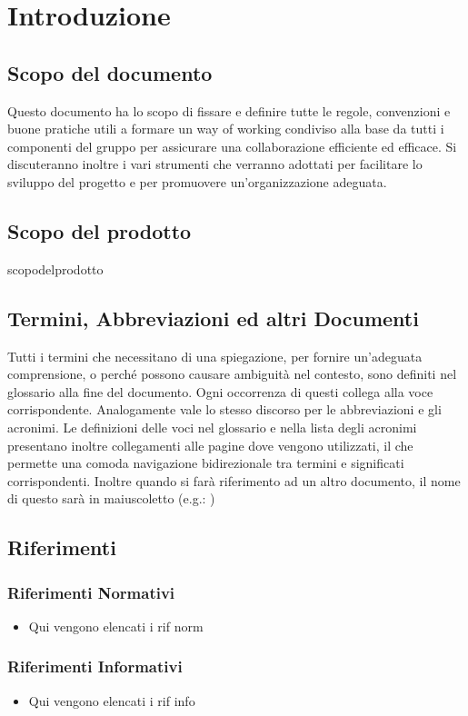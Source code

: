 \section{Introduzione}
\subsection{Scopo del documento}
    Questo documento ha lo scopo di fissare e definire tutte le regole, convenzioni e buone pratiche utili a formare un way of working condiviso alla base da tutti i componenti del gruppo per assicurare una collaborazione efficiente ed efficace. Si discuteranno inoltre i vari strumenti che verranno adottati per facilitare lo sviluppo del progetto e per promuovere un'organizzazione adeguata.

\subsection{Scopo del prodotto}
    scopodelprodotto

\subsection{Termini, Abbreviazioni ed altri Documenti}
    Tutti i termini che necessitano di una spiegazione, per fornire un'adeguata comprensione, o perché possono causare ambiguità nel contesto, sono definiti nel glossario alla fine del documento. Ogni occorrenza di questi collega alla voce corrispondente. Analogamente vale lo stesso discorso per le abbreviazioni e gli acronimi. Le definizioni delle voci nel glossario e nella lista degli acronimi presentano inoltre collegamenti alle pagine dove vengono utilizzati, il che permette una comoda navigazione bidirezionale tra termini e significati corrispondenti.
    Inoltre quando si farà riferimento ad un altro documento, il nome di questo sarà in maiuscoletto (e.g.: \textsc{})

\subsection{Riferimenti}
    \subsubsection{Riferimenti Normativi}
        \begin{itemize}
            \item Qui vengono elencati i rif norm
        \end{itemize}
    \subsubsection{Riferimenti Informativi}
        \begin{itemize}
            \item Qui vengono elencati i rif info
        \end{itemize}

\pagebreak